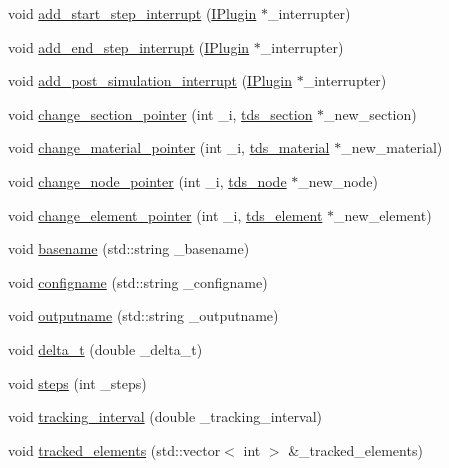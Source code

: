 \begin{DoxyCompactItemize}
\item 
void \hyperlink{classtds__run_a53af820867a6889a0f992747b025e960}{add\-\_\-start\-\_\-step\-\_\-interrupt} (\hyperlink{classIPlugin}{I\-Plugin} $\ast$\-\_\-interrupter)
\item 
void \hyperlink{classtds__run_ac0c00ed2b05ebefed18ffd4d1df9d939}{add\-\_\-end\-\_\-step\-\_\-interrupt} (\hyperlink{classIPlugin}{I\-Plugin} $\ast$\-\_\-interrupter)
\item 
void \hyperlink{classtds__run_ab00abee313469532a8ab080aca7bd646}{add\-\_\-post\-\_\-simulation\-\_\-interrupt} (\hyperlink{classIPlugin}{I\-Plugin} $\ast$\-\_\-interrupter)
\item 
void \hyperlink{classtds__run_a9374772ea6de814d7dfded259832f6b6}{change\-\_\-section\-\_\-pointer} (int \-\_\-i, \hyperlink{classtds__section}{tds\-\_\-section} $\ast$\-\_\-new\-\_\-section)
\item 
void \hyperlink{classtds__run_a03691796a9eebdfbf5bc65e5b705254c}{change\-\_\-material\-\_\-pointer} (int \-\_\-i, \hyperlink{classtds__material}{tds\-\_\-material} $\ast$\-\_\-new\-\_\-material)
\item 
void \hyperlink{classtds__run_a682cac3d47e4b6ed3e005d37041db08b}{change\-\_\-node\-\_\-pointer} (int \-\_\-i, \hyperlink{classtds__node}{tds\-\_\-node} $\ast$\-\_\-new\-\_\-node)
\item 
void \hyperlink{classtds__run_adfce89e41fb6ffe66fbbcb3dadcf101a}{change\-\_\-element\-\_\-pointer} (int \-\_\-i, \hyperlink{classtds__element}{tds\-\_\-element} $\ast$\-\_\-new\-\_\-element)
\item 
void \hyperlink{classtds__run_a43fa7246bfeda6b5e30e7064c798ce44}{basename} (std\-::string \-\_\-basename)
\item 
void \hyperlink{classtds__run_af835c5821513196c95ea1aa8843b7c4d}{configname} (std\-::string \-\_\-configname)
\item 
void \hyperlink{classtds__run_ab915e669b626f046e452bc8986dc2745}{outputname} (std\-::string \-\_\-outputname)
\item 
void \hyperlink{classtds__run_a3c6f314b5abe50031704b3993624ac98}{delta\-\_\-t} (double \-\_\-delta\-\_\-t)
\item 
void \hyperlink{classtds__run_a3ef12a27264daabbce95d66a05a1783f}{steps} (int \-\_\-steps)
\item 
void \hyperlink{classtds__run_af6c0667d9868be944a1d3e5880609f8a}{tracking\-\_\-interval} (double \-\_\-tracking\-\_\-interval)
\item 
void \hyperlink{classtds__run_a555ffb37cdd6f1a9b877ae4b3be32acb}{tracked\-\_\-elements} (std\-::vector$<$ int $>$ \&\-\_\-tracked\-\_\-elements)

\end{DoxyCompactItemize}
